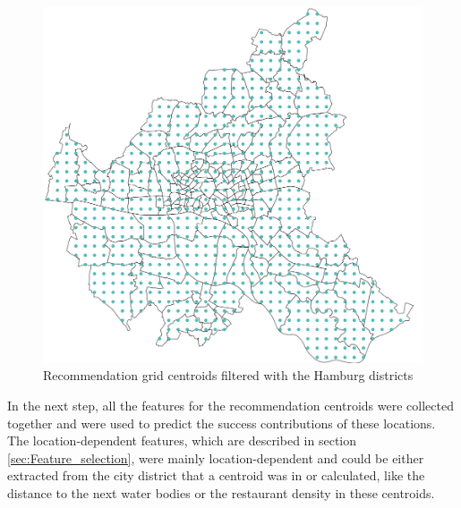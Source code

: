 \documentclass[a4paper, 11pt, oneside]{Thesis}  %
\begin{document}
\begin{figure}[h]
\includegraphics[scale=0.7]{Figures/Recommendation_map/Recommendation_Grid_Centroids_reduced.png}
\centering
\caption{Recommendation grid centroids filtered with the Hamburg districts}
\label{fig:Recommendation_Grid_Centroids_reduced}
\end{figure}

In the next step, all the features for the recommendation centroids were collected together and were used to predict the success contributions of these locations. The location-dependent features, which are described in section \ref{sec:Feature_selection}, were mainly location-dependent and could be either extracted from the city district that a centroid was in or calculated, like the distance to the next water bodies or the restaurant density in these centroids.
\end{document}
